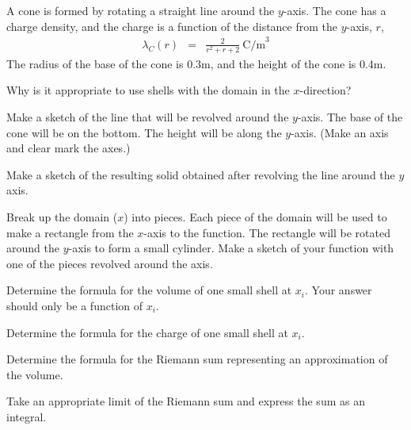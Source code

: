 \begin{problem}
  \item A cone is formed by rotating a straight line around the
    $y$-axis.  The cone has a charge density, and the charge is a
    function of the distance from the $y$-axis, $r$,
       \begin{eqnarray*}
         \lambda_C(r) & = & \frac{2}{r^2+r+2} ~ \mathrm{C/m}^3
       \end{eqnarray*}
       The radius of the base of the cone is 0.3m, and the height of
       the cone is 0.4m.
       \begin{subproblem}
         \item Why is it appropriate to use shells with the domain in
           the $x$-direction?
           \vfill
         \item
           Make a sketch of the line that will be revolved around the $y$-axis.
           The base of the cone will be on the bottom.
           The height will be along the $y$-axis.
           (Make an axis and clear mark the axes.)
           \vfill
           \vfill

         \item Make a sketch of the resulting solid obtained after
           revolving the line around the $y$ axis.
           \vfill

         \item Break up the domain ($x$) into pieces. Each piece of
           the domain will be used to make a rectangle from the
           $x$-axis to the function. The rectangle will be rotated
           around the $y$-axis to form a small cylinder.  Make a
           sketch of your function with one of the pieces revolved
           around the axis.  \vfill \vfill

         \clearpage

         \item Determine the formula for the volume of one small shell at $x_i$. Your answer should only be a function of $x_i$.
           \vfill

         \item Determine the formula for the charge of one small shell at $x_i$.
           \vfill

         \item Determine the formula for the Riemann sum representing an approximation of the volume.
           \vfill

         \item Take an appropriate limit of the Riemann sum and express the sum as an integral.
           \vfill

       \end{subproblem}
\end{problem}

